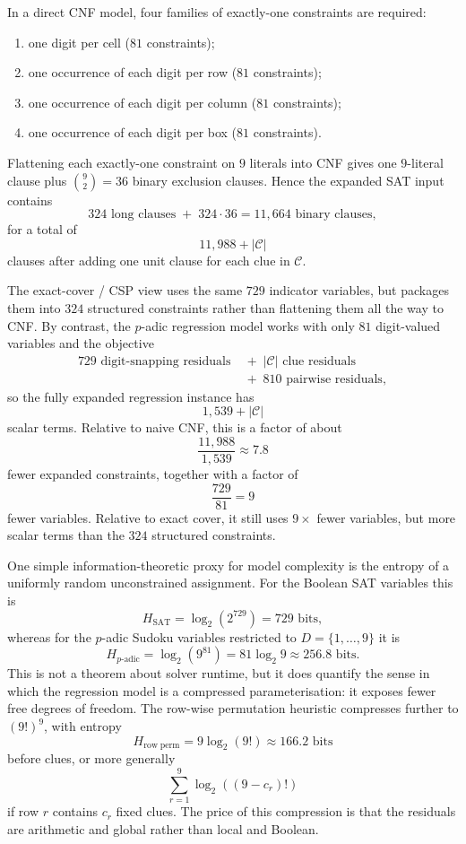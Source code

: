 \documentclass[11pt]{article}
\begin{document}
In a direct CNF model, four families of exactly-one constraints are required:
\begin{enumerate}
    \item one digit per cell ($81$ constraints);
    \item one occurrence of each digit per row ($81$ constraints);
    \item one occurrence of each digit per column ($81$ constraints);
    \item one occurrence of each digit per box ($81$ constraints).
\end{enumerate}
Flattening each exactly-one constraint on $9$ literals into CNF gives one $9$-literal clause plus $\binom{9}{2}=36$ binary exclusion clauses. Hence the expanded SAT input contains
\[
324 \text{ long clauses} \;+\; 324\cdot 36 = 11{,}664 \text{ binary clauses},
\]
for a total of
\[
11{,}988 + |\mathcal{C}|
\]
clauses after adding one unit clause for each clue in $\mathcal{C}$.

The exact-cover / CSP view uses the same $729$ indicator variables, but packages them into $324$ structured constraints rather than flattening them all the way to CNF. By contrast, the $p$-adic regression model works with only $81$ digit-valued variables and the objective
\[
\begin{aligned}
729 \text{ digit-snapping residuals} &\;+\; |\mathcal{C}| \text{ clue residuals} \\
&\;+\; 810 \text{ pairwise residuals},
\end{aligned}
\]
so the fully expanded regression instance has
\[
1{,}539 + |\mathcal{C}|
\]
scalar terms. Relative to naive CNF, this is a factor of about
\[
\frac{11{,}988}{1{,}539} \approx 7.8
\]
fewer expanded constraints, together with a factor of
\[
\frac{729}{81} = 9
\]
fewer variables. Relative to exact cover, it still uses $9\times$ fewer variables, but more scalar terms than the $324$ structured constraints.

One simple information-theoretic proxy for model complexity is the entropy of a uniformly random unconstrained assignment. For the Boolean SAT variables this is
\[
H_{\mathrm{SAT}} = \log_2(2^{729}) = 729 \text{ bits},
\]
whereas for the $p$-adic Sudoku variables restricted to $D=\{1,\dots,9\}$ it is
\[
H_{p\text{-adic}} = \log_2(9^{81}) = 81\log_2 9 \approx 256.8 \text{ bits}.
\]
This is not a theorem about solver runtime, but it does quantify the sense in which the regression model is a compressed parameterisation: it exposes fewer free degrees of freedom. The row-wise permutation heuristic compresses further to $(9!)^9$, with entropy
\[
H_{\mathrm{row\;perm}} = 9\log_2(9!) \approx 166.2 \text{ bits}
\]
before clues, or more generally
\[
\sum_{r=1}^9 \log_2((9-c_r)!)
\]
if row $r$ contains $c_r$ fixed clues. The price of this compression is that the residuals are arithmetic and global rather than local and Boolean.
\end{document}
